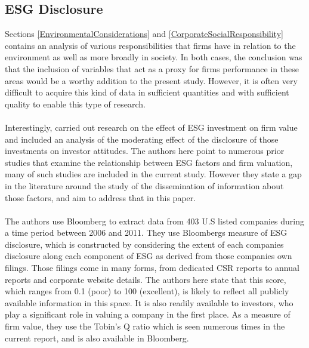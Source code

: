 \subsection {ESG Disclosure}
{Sections \ref{EnvironmentalConsiderations} and \ref{CorporateSocialResponsibility} contains an analysis of various responsibilities that firms have in relation to the environment as well as more broadly in society. In both cases, the conclusion was that the inclusion of variables that act as a proxy for firms performance in these areas would be a worthy addition to the present study. However, it is often very difficult to acquire this kind of data in sufficient quantities and with sufficient quality to enable this type of research. \\\\
Interestingly, \cite{fatemiESG} carried out research on the effect of ESG investment on firm value and included an analysis of the moderating effect of the disclosure of those investments on investor attitudes. The authors here point to numerous prior studies that examine the relationship between ESG factors and firm valuation, many of such studies are included in the current study. However they state a gap in the literature around the study of the dissemination of information about those factors, and aim to address that in this paper.   \\\\
The authors use Bloomberg to extract data from 403 U.S listed companies during a time period between 2006 and 2011. They use Bloombergs measure of ESG disclosure, which is constructed by considering the extent of each companies disclosure along each component of ESG as derived from those companies own filings. Those filings come in many forms, from dedicated CSR reports to annual reports and corporate website details. The authors here state that this score, which ranges from 0.1 (poor) to 100 (excellent), is likely to reflect all publicly available information in this space. It is also readily available to investors, who play a significant role in valuing a company in the first place. As a measure of firm value, they use the Tobin's Q ratio which is seen numerous times in the current report, and is also available in Bloomberg. \\\\ 
}
